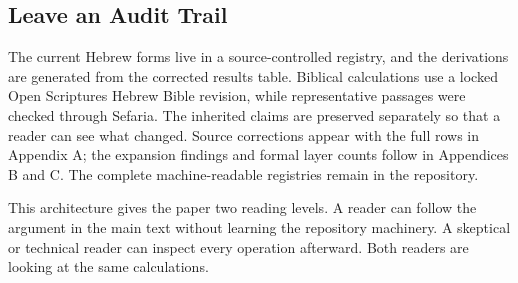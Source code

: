 \subsection{Leave an Audit Trail}

The current Hebrew forms live in a source-controlled registry, and the derivations are generated from the corrected results table. Biblical calculations use a locked Open Scriptures Hebrew Bible revision, while representative passages were checked through Sefaria.\cite{oshb,sefaria_library} The inherited claims are preserved separately so that a reader can see what changed. Source corrections appear with the full rows in Appendix A; the expansion findings and formal layer counts follow in Appendices B and C. The complete machine-readable registries remain in the repository.

This architecture gives the paper two reading levels. A reader can follow the argument in the main text without learning the repository machinery. A skeptical or technical reader can inspect every operation afterward. Both readers are looking at the same calculations.
